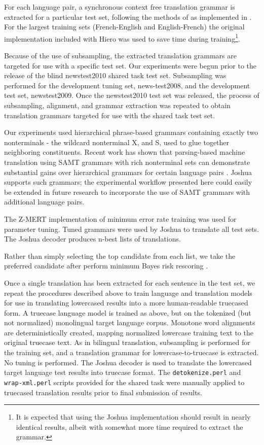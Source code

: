 \documentclass[11pt]{article}
\begin{document}
For each language pair, a synchronous context free translation grammar is extracted for a particular test set, following the methods of  as implemented in \cite{Schwartz-PBML}. For the largest training sets (French-English and English-French) the original \cite{Lopez2008} implementation included with Hiero was used to save time during training\footnote{It is expected that using the Joshua implementation should result in nearly identical results, albeit with somewhat more time required to extract the grammar.}.

Because of the use of subsampling, the extracted translation grammars are targeted for use with a specific test set. Our experiments were begun prior to the release of the blind newstest2010 shared task test set. Subsampling was performed for the development tuning set, news-test2008, and the development test set, newstest2009. Once the newstest2010 test set was released, the process of subsampling, alignment, and grammar extraction was repeated to obtain translation grammars targeted for use with the shared task test set. 

Our experiments used hierarchical phrase-based grammars containing exactly two nonterminals - the wildcard nonterminal X, and S, used to glue together neighboring constituents. Recent work has shown that parsing-based machine translation using SAMT \cite{samt2006} grammars with rich nonterminal sets can demonstrate substantial gains over hierarchical grammars for certain language pairs \cite{SCALE-report}. Joshua supports such grammars; the experimental workflow presented here could easily be extended in future research to incorporate the use of SAMT grammars with additional language pairs. 

The Z-MERT implementation \cite{Zaidan2009} of minimum error rate training \cite{Och2003c} was used for parameter tuning. Tuned grammars were used by Joshua to translate all test sets. The Joshua decoder produces n-best lists of translations. 

Rather than simply selecting the top candidate from each list, we take the preferred candidate after perform minimum Bayes risk rescoring \cite{Kumar2004b}.

Once a single translation has been extracted for each sentence in the test set, we repeat the procedures described above to train language and translation models for use in translating lowercased results into a more human-readable truecased form. A truecase language model is trained as above, but on the tokenized (but not normalized) monolingual target language corpus. Monotone word alignments are deterministically created, mapping normalized lowercase training text to the original truecase text. As in bilingual translation, subsampling is performed for the training set, and a translation grammar for lowercase-to-truecase is extracted. No tuning is performed. The Joshua decoder is used to translate the lowercased target language test results into truecase format. The {\tt detokenize.perl} and {\tt wrap-xml.perl} scripts provided for the shared task were manually applied to truecased translation results prior to final submission of results.
\end{document}
